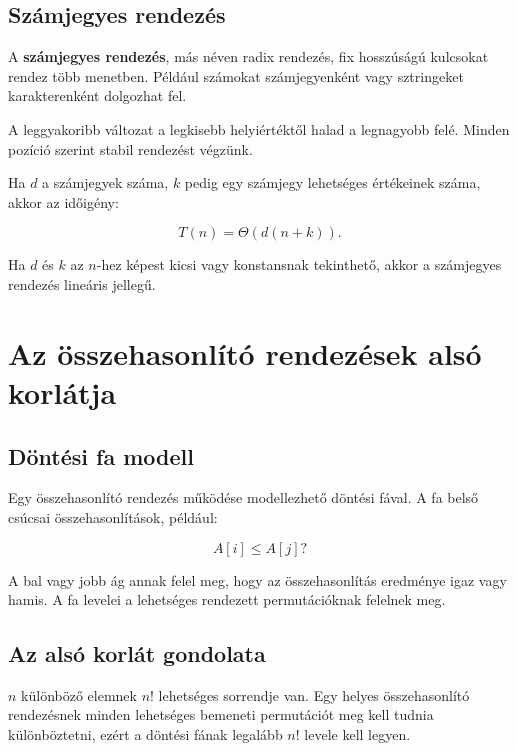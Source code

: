 \subsection{Számjegyes rendezés}

A \textbf{számjegyes rendezés}, más néven radix rendezés, fix hosszúságú kulcsokat rendez több menetben. Például számokat számjegyenként vagy sztringeket karakterenként dolgozhat fel.

A leggyakoribb változat a legkisebb helyiértéktől halad a legnagyobb felé. Minden pozíció szerint stabil rendezést végzünk.


Ha $d$ a számjegyek száma, $k$ pedig egy számjegy lehetséges értékeinek száma, akkor az időigény:

\[
T(n)=\Theta(d(n+k)).
\]

Ha $d$ és $k$ az $n$-hez képest kicsi vagy konstansnak tekinthető, akkor a számjegyes rendezés lineáris jellegű.

\begin{center}

\end{center}

\section{Az összehasonlító rendezések alsó korlátja}

\subsection{Döntési fa modell}

Egy összehasonlító rendezés működése modellezhető döntési fával. A fa belső csúcsai összehasonlítások, például:

\[
A[i] \leq A[j]?
\]

A bal vagy jobb ág annak felel meg, hogy az összehasonlítás eredménye igaz vagy hamis. A fa levelei a lehetséges rendezett permutációknak felelnek meg.



\subsection{Az alsó korlát gondolata}

$n$ különböző elemnek $n!$ lehetséges sorrendje van. Egy helyes összehasonlító rendezésnek minden lehetséges bemeneti permutációt meg kell tudnia különböztetni, ezért a döntési fának legalább $n!$ levele kell legyen.


